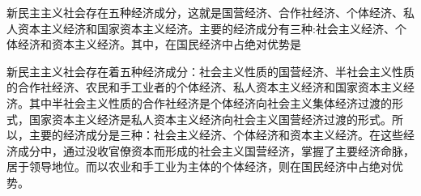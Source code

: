 \question 新民主主义社会存在五种经济成分，这就是国营经济、合作社经济、个体经济、私人资本主义经济和国家资本主义经济。主要的经济成分有三种:社会主义经济、个体经济和资本主义经济。其中，在国民经济中占绝对优势是
\par{}
\begin{solution}新民主主义社会存在着五种经济成分：社会主义性质的国营经济、半社会主义性质的合作社经济、农民和手工业者的个体经济、私人资本主义经济和国家资本主义经济。其中半社会主义性质的合作社经济是个体经济向社会主义集体经济过渡的形式，国家资本主义经济是私人资本主义经济向社会主义国营经济过渡的形式。所以，主要的经济成分是三种：社会主义经济、个体经济和资本主义经济。在这些经济成分中，通过没收官僚资本而形成的社会主义国营经济，掌握了主要经济命脉，居于领导地位。而以农业和手工业为主体的个体经济，则在国民经济中占绝对优势。
\end{solution}
